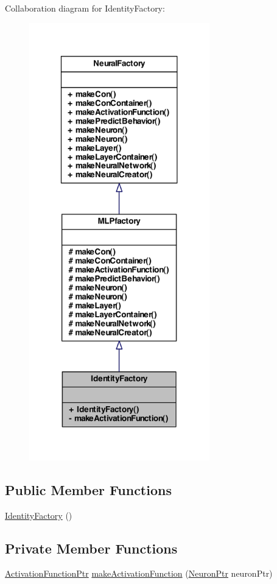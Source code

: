 Collaboration diagram for IdentityFactory:
\nopagebreak
\begin{figure}[H]
\begin{center}
\leavevmode
\includegraphics[width=222pt]{class_identity_factory__coll__graph}
\end{center}
\end{figure}
\subsection*{Public Member Functions}
\begin{DoxyCompactItemize}
\item 
\hyperlink{class_identity_factory_ae11ff3d50097edf8db7a7b16c81e44b4}{IdentityFactory} ()
\end{DoxyCompactItemize}
\subsection*{Private Member Functions}
\begin{DoxyCompactItemize}
\item 
\hyperlink{_a_m_o_r_e_8h_a77602a0277a02e5769c3df0adc669b17}{ActivationFunctionPtr} \hyperlink{class_identity_factory_a13a9bb3996539b46c4d9eee7c2024ea1}{makeActivationFunction} (\hyperlink{_a_m_o_r_e_8h_ac1ea936c2c7728eb382278131652fef4}{NeuronPtr} neuronPtr)
\end{DoxyCompactItemize}


